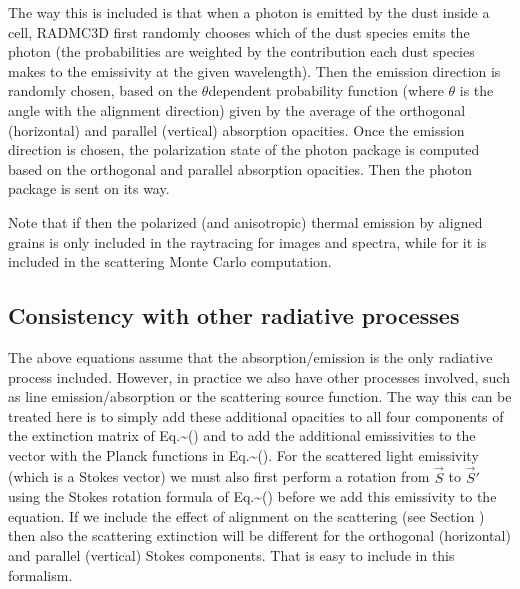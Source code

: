 \documentclass[letterpaper,10pt,english]{sphinxmanual}
\begin{document}
The way this is included is that when a photon is emitted by the dust inside a
cell, RADMC\sphinxhyphen{}3D first randomly chooses which of the dust species emits the photon
(the probabilities are weighted by the contribution each dust species makes to
the emissivity at the given wavelength).  Then the emission direction is
randomly chosen, based on the \(\theta\)\sphinxhyphen{}dependent probability function
(where \(\theta\) is the angle with the alignment direction) given by the
average of the orthogonal (horizontal) and parallel (vertical) absorption
opacities. Once the emission direction is chosen, the polarization state of the
photon package is computed based on the orthogonal and parallel absorption
opacities. Then the photon package is sent on its way.

Note that if  then the polarized (and anisotropic)
thermal emission by aligned grains is only included in the ray\sphinxhyphen{}tracing for
images and spectra, while for  it is  included
in the scattering Monte Carlo computation.


\subsection{Consistency with other radiative processes}
\label{\detokenize{dustradtrans:consistency-with-other-radiative-processes}}
The above equations assume that the absorption/emission is the only radiative
process included. However, in practice we also have other processes involved,
such as line emission/absorption or the scattering source function. The way this
can be treated here is to simply add these additional opacities to all four
components of the extinction matrix of
Eq.\textasciitilde{}() and to add the additional
emissivities to the vector with the Planck functions in
Eq.\textasciitilde{}(). For the scattered light
emissivity (which is a Stokes vector) we must also first perform a rotation from
\(\vec S\) to \(\vec S'\) using the Stokes rotation formula of
Eq.\textasciitilde{}() before we add this emissivity to the
equation. If we include the effect of alignment on the scattering (see Section
{\hyperref[\detokenize{dustradtrans:sec-align-scat}]{}}) then also the scattering extinction will be different for
the orthogonal (horizontal) and parallel (vertical) Stokes components. That is
easy to include in this formalism.
\end{document}
